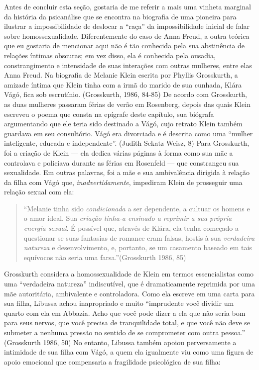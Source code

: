 Antes de concluir esta seção, gostaria de me referir a mais uma vinheta
marginal da história da psicanálise que se encontra na biografia de uma
pioneira para ilustrar a impossibilidade de deslocar a ``raça'' da
impossibilidade inicial de falar sobre homossexualidade. Diferentemente
do caso de Anna Freud, a outra teórica que eu gostaria de mencionar aqui
não é tão conhecida pela sua abstinência de relações íntimas obscuras;
em vez disso, ela é conhecida pela ousadia, constrangimento e
intensidade de suas interações com outras mulheres, entre elas Anna
Freud. Na biografia de Melanie Klein escrita por Phyllis Grosskurth, a
amizade íntima que Klein tinha com a irmã do marido de sua cunhada,
Klára Vágó, fica sob escrutínio. (Grosskurth, 1986, 84-85) De acordo com
Grosskurth, as duas mulheres passaram férias de verão em Rosenberg,
depois das quais Klein escreveu o poema que consta na epígrafe deste
capítulo, sua biógrafa argumentando que ele teria sido destinado a Vágó,
cujo retrato Klein também guardava em seu consultório. Vágó era
divorciada e é descrita como uma ``mulher inteligente, educada e
independente''. (Judith Sekatz Weisz, 8) Para Grosskurth, foi a criação
de Klein --- ela dedica várias páginas à forma como sua mãe a controlava
e policiava durante as férias em Rosenfeld --- que constrangeu sua
sexualidade. Em outras palavras, foi a mãe e sua ambivalência dirigida à
relação da filha com Vágó que, \emph{inadvertidamente}, impediram Klein
de prosseguir uma relação sexual com ela:

\begin{quote}
``Melanie tinha sido \emph{condicionada} a ser dependente, a cultuar os
homens e o amor ideal. Sua \emph{criação tinha-a ensinado a reprimir a
sua própria energia sexual}. É possível que, através de Klára, ela tenha
começado a questionar se suas fantasias de romance eram falsas, hostis à
sua \emph{verdadeira natureza} e desenvolvimento, e, portanto, se um
casamento baseado em tais equívocos não seria uma farsa.''(Grosskurth
1986, 85)
\end{quote}

Grosskurth considera a homossexualidade de Klein em termos
essencialistas como uma ``verdadeira natureza'' indiscutível, que é
dramaticamente reprimida por uma mãe autoritária, ambivalente e
controladora. Como ela escreve em uma carta para sua filha, Libussa
achou inapropriado e muito ``imprudente você dividir um quarto com ela
em Abbazia. Acho que você pode dizer a ela que não seria bom para seus
nervos, que você precisa de tranquilidade total, e que você não deve se
submeter a nenhuma pressão no sentido de se comprometer com outra
pessoa.'' (Grosskurth 1986, 50) No entanto, Libussa também apoiou
perversamente a intimidade de sua filha com Vágó, a quem ela igualmente
viu como uma figura de apoio emocional que compensaria a fragilidade
psicológica de sua filha:

